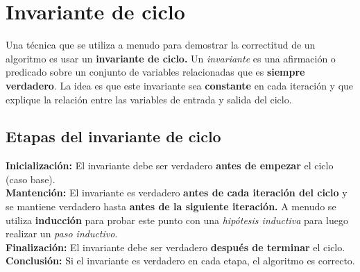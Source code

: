 \section{Invariante de ciclo}
Una técnica que se utiliza a menudo para demostrar la correctitud de un
algoritmo es usar un \textbf{invariante de ciclo.} Un \textit{invariante}
es una afirmación o predicado sobre un conjunto de variables relacionadas
que es \textbf{siempre verdadero}. La idea es que este invariante sea
\textbf{constante} en cada iteración y que explique la relación entre
las variables de entrada y salida del ciclo.

\subsection{Etapas del invariante de ciclo}
\textbf{Inicialización: }El invariante debe ser verdadero
\textbf{antes de empezar} el ciclo (caso base).\\

\textbf{Mantención: }El invariante es verdadero
\textbf{antes de cada iteración del ciclo} y se mantiene
verdadero hasta \textbf{antes de la siguiente iteración.}
A menudo se utiliza \textbf{inducción} para probar este
punto con una \textit{hipótesis inductiva} para luego
realizar un \textit{paso inductivo}.\\

\textbf{Finalización: }El invariante debe ser verdadero
\textbf{después de terminar} el ciclo.\\

\textbf{Conclusión: }Si el invariante es verdadero en cada etapa, el
algoritmo es correcto.
